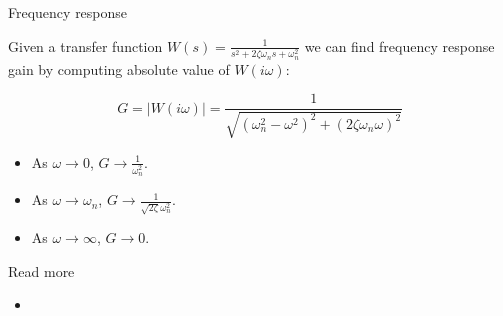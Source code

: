 \documentclass{beamer}
\begin{document}
\begin{frame}{Frequency response}
	\begin{flushleft}
		
		Given a transfer function $W(s) = \frac{1}{s^2 + 2 \zeta \omega_n s + \omega_n^2}$ we can find frequency response gain by computing absolute value of $W(i\omega)$:
		
		\begin{equation}
			G = |W(i\omega)| = \frac{1}{\sqrt{(\omega_n^2 - \omega^2)^2 + (2 \zeta \omega_n \omega)^2}}
		\end{equation}
	
	\begin{itemize}
		\item As $\omega \rightarrow 0$, $G \rightarrow \frac{1}{\omega_n^2}$.
		\item As $\omega \rightarrow \omega_n$, $G \rightarrow \frac{1}{\sqrt{2\zeta}\omega_n^2}$.
		\item As $\omega \rightarrow \infty$, $G \rightarrow 0$.
	\end{itemize}
		
		
	\end{flushleft}
\end{frame}



\begin{frame}{Read more}
	\begin{flushleft}
		
		\begin{itemize}
			\item {}
			
		\end{itemize}
		
		
	\end{flushleft}
\end{frame}


\myqrframe
\end{document}

